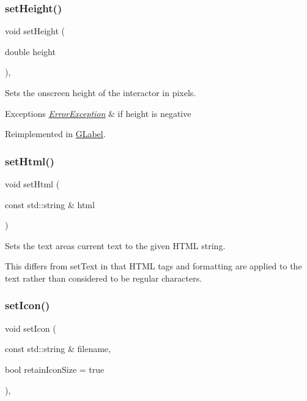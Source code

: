 \subsubsection{\texorpdfstring{set\+Height()}{setHeight()}}
{\footnotesize\ttfamily void set\+Height (\begin{DoxyParamCaption}\item[{double}]{height }\end{DoxyParamCaption})\hspace{0.3cm}{\ttfamily [virtual]}, {\ttfamily [inherited]}}



Sets the onscreen height of the interactor in pixels. 


\begin{DoxyExceptions}{Exceptions}
{\em \mbox{\hyperlink{classErrorException}{Error\+Exception}}} & if height is negative \\
\hline
\end{DoxyExceptions}


Reimplemented in \mbox{\hyperlink{classGLabel_a8a1f6693796b536d1ace7ce0ff66afee}{G\+Label}}.

\mbox{\label{classGTextArea_a71ca94fd0ab4223097c4d524ddafe94f}} 
\subsubsection{\texorpdfstring{set\+Html()}{setHtml()}}
{\footnotesize\ttfamily void set\+Html (\begin{DoxyParamCaption}\item[{const std\+::string \&}]{html }\end{DoxyParamCaption})\hspace{0.3cm}{\ttfamily [virtual]}}



Sets the text area\textquotesingle{}s current text to the given H\+T\+ML string. 

This differs from set\+Text in that H\+T\+ML tags and formatting are applied to the text rather than considered to be regular characters. \mbox{\label{classGInteractor_a762e139aa311461c3984d3ad28293f64}} 
\subsubsection{\texorpdfstring{set\+Icon()}{setIcon()}}
{\footnotesize\ttfamily void set\+Icon (\begin{DoxyParamCaption}\item[{const std\+::string \&}]{filename,  }\item[{bool}]{retain\+Icon\+Size = {\ttfamily true} }\end{DoxyParamCaption})\hspace{0.3cm}{\ttfamily [virtual]}, {\ttfamily [inherited]}}



